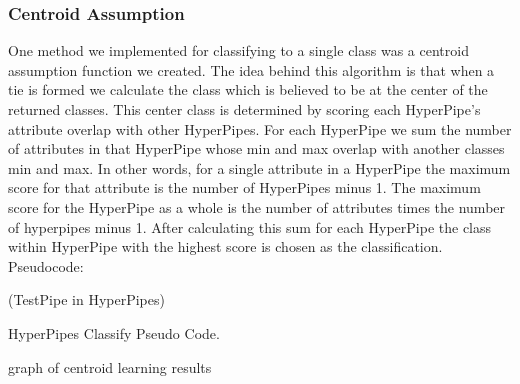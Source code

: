 \subsubsection{Centroid Assumption}
One method we implemented for classifying to a single class was
a centroid assumption function we created. The idea behind this
algorithm is that when a tie is formed we calculate the class 
which is believed to be at the center of the returned classes. 
This center class is determined by scoring each HyperPipe's 
attribute overlap with other HyperPipes. For each HyperPipe we 
sum the number of attributes in that HyperPipe whose min and max 
overlap with another classes min and max. In other words, for a 
single attribute in a HyperPipe the maximum score for that 
attribute is the number of HyperPipes minus 1. The maximum score 
for the HyperPipe as a whole is the number of attributes times 
the number of hyperpipes minus 1. After calculating this sum for 
each HyperPipe the class within HyperPipe with the highest score 
is chosen as the classification. Pseudocode:
\begin{program}
\begin{algorithmic}
\ForAll(TestPipe in HyperPipes)
\EndIf
\EndFor
\EndIf
\EndFor
\EndFor
\EndProcedure
\end{algorithmic}
\caption{HyperPipes Classify Pseudo Code.}\label{PseudocodeClass}
\end{program}
graph of centroid learning results

